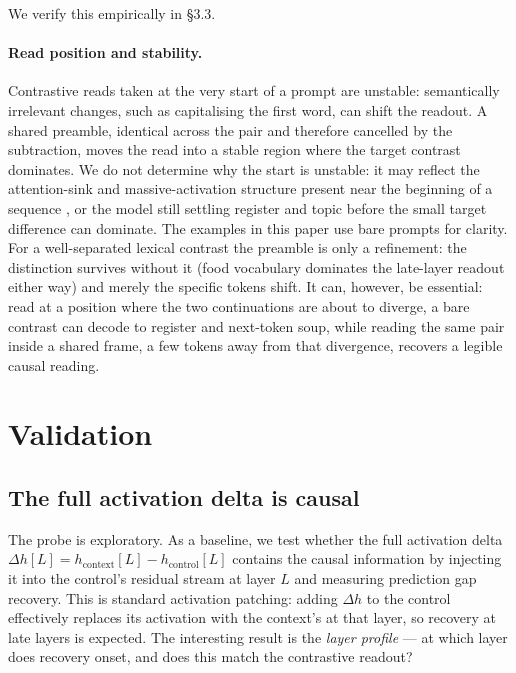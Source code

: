 \documentclass[11pt]{article}
\newcommand{\dhh}{\Delta h}
\begin{document}
We verify this empirically in \S3.3.

\paragraph{Read position and stability.} Contrastive reads taken at
the very start of a prompt are unstable: semantically irrelevant
changes, such as capitalising the first word, can shift the readout.
A shared preamble, identical across the pair and therefore cancelled
by the subtraction, moves the read into a stable region where the
target contrast dominates. We do not determine why the start is
unstable: it may reflect the attention-sink and massive-activation
structure present near the beginning of a sequence \citep{sun2026},
or the model still settling register and topic before the small target
difference can dominate. The examples in this paper use bare prompts
for clarity. For a well-separated lexical contrast the preamble is
only a refinement: the distinction survives without it (food
vocabulary dominates the late-layer readout either way) and merely the
specific tokens shift. It can, however, be essential: read at a
position where the two continuations are about to diverge, a bare
contrast can decode to register and next-token soup, while reading the
same pair inside a shared frame, a few tokens away from that
divergence, recovers a legible causal reading.

\section{Validation}

\subsection{The full activation delta is causal}

The probe is exploratory. As a baseline,
we test whether the full activation delta $\dhh[L] = h_\text{context}[L] - h_\text{control}[L]$
contains the causal information by injecting it into the control's residual
stream at layer $L$ and measuring prediction gap recovery. This is standard
activation patching: adding $\dhh$ to the control effectively replaces its
activation with the context's at that layer, so recovery at late layers is
expected. The interesting result is the \emph{layer profile} --- at which layer does
recovery onset, and does this match the contrastive readout?
\end{document}
